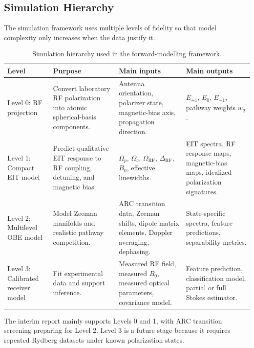 \documentclass{ieeeaccess}
\begin{document}
\subsection{Simulation Hierarchy}
\label{annex:simulation_hierarchy}

The simulation framework uses multiple levels of fidelity so that model complexity only increases when the data justify it.

\begin{table}[!t]
\caption{Simulation hierarchy used in the forward-modelling framework.}
\label{tab:annex_simulation_levels}
\centering
\renewcommand{\arraystretch}{1.12}
\scriptsize
\begin{tabular}{p{} p{} p{} p{}}
\hline
\textbf{Level} & \textbf{Purpose} & \textbf{Main inputs} & \textbf{Main outputs} \\
\hline
Level 0: RF projection &
Convert laboratory RF polarization into atomic spherical-basis components. &
Antenna orientation, polarizer state, magnetic-bias axis, propagation direction. &
\(E_{+1}\), \(E_0\), \(E_{-1}\), pathway weights \(w_q\). \\

Level 1: Compact EIT model &
Predict qualitative EIT response to RF coupling, detuning, and magnetic bias. &
\(\Omega_p\), \(\Omega_c\), \(\Omega_{\mathrm{RF}}\), \(\Delta_{\mathrm{RF}}\), \(B_0\), effective linewidths. &
EIT spectra, RF response maps, magnetic-bias maps, idealized polarization signatures. \\

Level 2: Multilevel OBE model &
Model Zeeman manifolds and realistic pathway competition. &
ARC transition data, Zeeman shifts, dipole matrix elements, Doppler averaging, dephasing. &
State-specific spectra, feature predictions, separability metrics. \\

Level 3: Calibrated receiver model &
Fit experimental data and support inference. &
Measured RF field, measured \(B_0\), measured optical parameters, covariance model. &
Feature prediction, classification model, partial or full Stokes estimator. \\
\hline
\end{tabular}
\end{table}

The interim report mainly supports Levels 0 and 1, with ARC transition screening preparing for Level 2. Level 3 is a future stage because it requires repeated Rydberg datasets under known polarization states.
\end{document}
